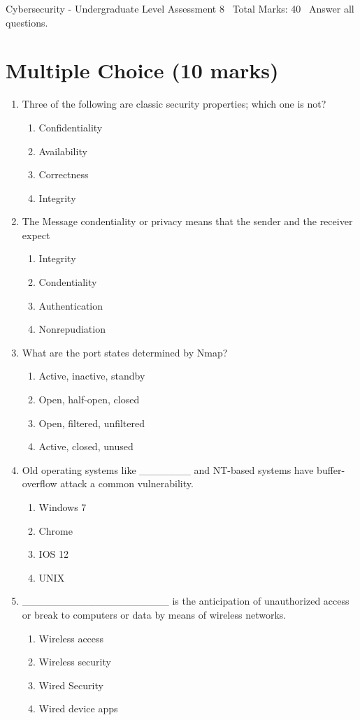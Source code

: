 \documentclass[12pt]{article}
\begin{document}
\begin{center}
Cybersecurity - Undergraduate Level Assessment 8 \
Total Marks: 40 \
Answer all questions.
\end{center}

\section*{Multiple Choice (10 marks)}
\begin{enumerate}[label=\arabic*.]
\item Three of the following are classic security properties; which one is not?
\begin{enumerate}[label=(\alph*)]
    \item Confidentiality
    \item Availability
    \item Correctness
    \item Integrity
\end{enumerate}
\item The Message condentiality or privacy means that the sender and the receiver expect
\begin{enumerate}[label=(\alph*)]
    \item Integrity
    \item Condentiality
    \item Authentication
    \item Nonrepudiation
\end{enumerate}
\item What are the port states determined by Nmap?
\begin{enumerate}[label=(\alph*)]
    \item Active, inactive, standby
    \item Open, half-open, closed
    \item Open, filtered, unfiltered
    \item Active, closed, unused
\end{enumerate}
\item Old operating systems like \_\_\_\_\_\_\_ and NT-based systems have buffer-overflow attack a common vulnerability.
\begin{enumerate}[label=(\alph*)]
    \item Windows 7
    \item Chrome
    \item IOS 12
    \item UNIX
\end{enumerate}
\item \_\_\_\_\_\_\_\_\_\_\_\_\_\_\_\_\_\_\_\_ is the anticipation of unauthorized access or break to computers or data by means of wireless networks.
\begin{enumerate}[label=(\alph*)]
    \item Wireless access
    \item Wireless security
    \item Wired Security
    \item Wired device apps
\end{enumerate}
\end{enumerate}
\end{document}
